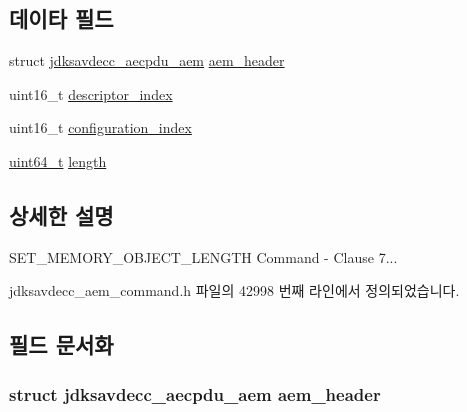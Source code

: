 \subsection*{데이타 필드}
\begin{DoxyCompactItemize}
\item 
struct \hyperlink{structjdksavdecc__aecpdu__aem}{jdksavdecc\+\_\+aecpdu\+\_\+aem} \hyperlink{structjdksavdecc__aem__command__set__memory__object__length_ae1e77ccb75ff5021ad923221eab38294}{aem\+\_\+header}
\item 
uint16\+\_\+t \hyperlink{structjdksavdecc__aem__command__set__memory__object__length_a042bbc76d835b82d27c1932431ee38d4}{descriptor\+\_\+index}
\item 
uint16\+\_\+t \hyperlink{structjdksavdecc__aem__command__set__memory__object__length_afaad1bd7c66f9611e134d8c5ce98f444}{configuration\+\_\+index}
\item 
\hyperlink{parse_8c_aec6fcb673ff035718c238c8c9d544c47}{uint64\+\_\+t} \hyperlink{structjdksavdecc__aem__command__set__memory__object__length_a190b76b1f3d5bd26920300e5f073739b}{length}
\end{DoxyCompactItemize}


\subsection{상세한 설명}
S\+E\+T\+\_\+\+M\+E\+M\+O\+R\+Y\+\_\+\+O\+B\+J\+E\+C\+T\+\_\+\+L\+E\+N\+G\+TH Command -\/ Clause 7... 

jdksavdecc\+\_\+aem\+\_\+command.\+h 파일의 42998 번째 라인에서 정의되었습니다.



\subsection{필드 문서화}
\subsubsection[{\texorpdfstring{aem\+\_\+header}{aem_header}}]{\setlength{\rightskip}{0pt plus 5cm}struct {\bf jdksavdecc\+\_\+aecpdu\+\_\+aem} aem\+\_\+header}\hypertarget{structjdksavdecc__aem__command__set__memory__object__length_ae1e77ccb75ff5021ad923221eab38294}{}\label{structjdksavdecc__aem__command__set__memory__object__length_ae1e77ccb75ff5021ad923221eab38294}


